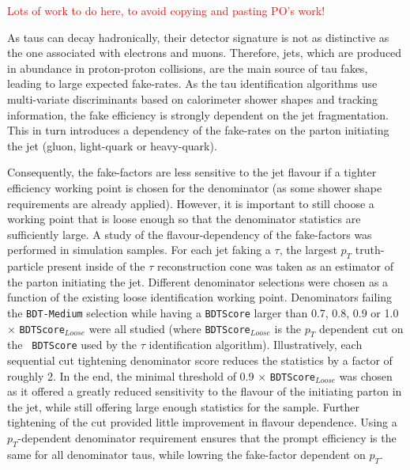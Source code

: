 \textcolor{red}{Lots of work to do here, to avoid copying and pasting PO's work!}

As taus can decay hadronically, their detector signature is not as distinctive as the one
associated with electrons and muons.  Therefore, jets, which are produced in abundance in
proton-proton collisions, are the main source of tau fakes, leading to large expected
fake-rates.  As the tau identification algorithms use multi-variate discriminants based on
calorimeter shower shapes and tracking information, the fake efficiency is strongly
dependent on the jet fragmentation. This in turn introduces a dependency of the fake-rates
on the parton initiating the jet (gluon, light-quark or heavy-quark).

Consequently, the fake-factors are less sensitive to the jet flavour if a tighter
efficiency working point is chosen for the denominator (as some shower shape requirements
are already applied).  However, it is important to still choose a working point that is
loose enough so that the denominator statistics are sufficiently large. A study of the
flavour-dependency of the fake-factors was performed in simulation samples.  For each jet
faking a $\tau$, the largest $p_{T}$ truth-particle present inside of the $\tau$
reconstruction cone was taken as an estimator of the parton initiating the jet.
Different denominator selections were chosen as a function of the existing loose
identification working point.  Denominators failing the \texttt{BDT-Medium} selection while
having a \texttt{BDTScore} larger than 0.7, 0.8, 0.9 or 1.0 $\times$ \texttt{BDTScore$_{Loose}$}
were all studied (where \texttt{BDTScore$_{Loose}$} is the $p_{T}$ dependent cut on the \texttt{  BDTScore} used by the $\tau$ identification algorithm).  Illustratively, each sequential
cut tightening denominator score reduces the statistics by a factor of roughly 2.  In the
end, the minimal threshold of 0.9 $\times$ \texttt{BDTScore$_{Loose}$} was chosen as it
offered a greatly reduced sensitivity to the flavour of the initiating parton in the jet,
while still offering large enough statistics for the sample. Further tightening of the cut
provided little improvement in flavour dependence. Using a $p_{T}$-dependent denominator
requirement ensures that the prompt efficiency is the same for all denominator taus, while
lowring the fake-factor dependent on $p_{T}$.


